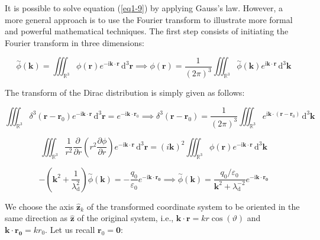 It is possible to solve equation (\ref{eq1-9}) by applying Gauss's law. However, a more general approach is to use the Fourier transform to illustrate more formal and powerful mathematical techniques. The first step consists of initiating the Fourier transform in three dimensions:

\begin{equation}
    \stackrel{\sim}{\phi}(\mathbf{k})=\iiint_{\mathbb{R}^3}\phi(\mathbf{r})e^{-\mathrm{i}\mathbf{k}\cdot\mathbf{r}}\,\mathrm{d}^3\mathbf{r}\implies\phi(\mathbf{r})=\frac{1}{(2\pi)^3}\iiint_{\mathbb{R}^3}\stackrel{\sim}{\phi}(\mathbf{k})e^{\mathrm{i}\mathbf{k}\cdot\mathbf{r}}\,\mathrm{d}^3\mathbf{k}
\end{equation}

The transform of the Dirac distribution is simply given as follows:

\begin{equation}
    \iiint_{\mathbb{R}^3}\delta^3(\mathbf{r}-\mathbf{r}_0)e^{-\mathrm{i}\mathbf{k}\cdot\mathbf{r}}\,\mathrm{d}^3\mathbf{r}=e^{-\mathrm{i}\mathbf{k}\cdot\mathbf{r}_0}\implies \delta^3(\mathbf{r}-\mathbf{r}_0)=\frac{1}{(2\pi)^3}\iiint_{\mathbb{R}^3}e^{\mathrm{i}\mathbf{k}\cdot(\mathbf{r}-\mathbf{r}_0)}\,\mathrm{d}^3\mathbf{k}
\end{equation}

\begin{equation}
    \iiint_{\mathbb{R}^3}\frac{1}{r^2}\frac{\partial}{\partial r}\left(r^2\frac{\partial\phi}{\partial r}\right)e^{-\mathrm{i}\mathbf{k}\cdot\mathbf{r}}\,\mathrm{d}^3\mathbf{r}=(i\mathbf{k})^2\iiint_{\mathbb{R}^3}\phi(\mathbf{r}) e^{-\mathrm{i}\mathbf{k}\cdot\mathbf{r}}\,\mathrm{d}^3\mathbf{k}
\end{equation}

\begin{equation}
    -\left(\mathbf{k}^2+\frac{1}{\lambda_\mathrm{d}^2}\right)\stackrel{\sim}{\phi}(\mathbf{k})=-\frac{q_0}{\varepsilon_0}e^{-\mathrm{i}\mathbf{k}\cdot\mathbf{r_0}}\implies\stackrel{\sim}{\phi}(\mathbf{k})=\frac{q_0/\varepsilon_0}{\mathbf{k}^2+\lambda_\mathrm{d}^{-2}}e^{-\mathrm{i}\mathbf{k}\cdot\mathbf{r_0}}
\end{equation}

We choose the axis $\mathbf{\hat{z}}_k$ of the transformed coordinate system to be oriented in the same direction as $\mathbf{\hat{z}}$ of the original system, i.e., $\mathbf{k}\cdot\mathbf{r}=kr\cos(\vartheta)$ and $\mathbf{k}\cdot\mathbf{r_0}=kr_0$. Let us recall $\mathbf{r}_0=\mathbf{0}$:

